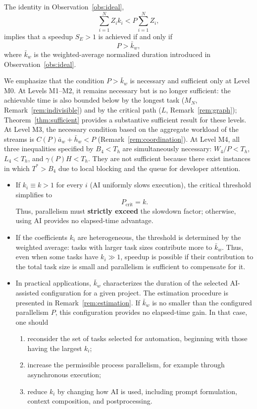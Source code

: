 \begin{remark}\label{rem:threshold}
The identity in Observation~\ref{obs:ideal},
\[
  \sum_{i=1}^{N} Z_i k_i < P \sum_{i=1}^{N} Z_i,
\]
implies that a speedup $S_E > 1$ is achieved if and only if
\[
  P > \bar{k}_w,
\]
where $\bar{k}_w$ is the weighted-average normalized duration introduced in Observation~\ref{obs:ideal}.

We emphasize that the condition $P > \bar{k}_w$ is necessary and sufficient only at Level M0. At Levels M1--M2, it remains necessary but is no longer sufficient: the achievable time is also bounded below by the longest task ($M_N$, Remark~\ref{rem:indivisible}) and by the critical path ($L$, Remark~\ref{rem:graph}); Theorem~\ref{thm:sufficient} provides a substantive sufficient result for these levels. At Level M3, the necessary condition based on the aggregate workload of the streams is $C(P)\bar a_w+\bar h_w<P$ (Remark~\ref{rem:coordination}). At Level M4, all three inequalities specified by $B_4<T_h$ are simultaneously necessary: $W_4/P<T_h$, $L_4<T_h$, and $\gamma(P)H<T_h$. They are not sufficient because there exist instances in which $T^{*}>B_4$ due to local blocking and the queue for developer attention.

\begin{itemize}
  \item If $k_i \equiv k > 1$ for every $i$ (AI uniformly slows execution), the critical threshold simplifies to
  \[
    P_{\text{crit}} = k.
  \]
  Thus, parallelism must \textbf{strictly exceed} the slowdown factor; otherwise, using AI provides no elapsed-time advantage.

  \item If the coefficients $k_i$ are heterogeneous, the threshold is determined by the weighted average: tasks with larger task sizes contribute more to $\bar{k}_w$. Thus, even when some tasks have $k_i \gg 1$, speedup is possible if their contribution to the total task size is small and parallelism is sufficient to compensate for it.

  \item In practical applications, $\bar{k}_w$ characterizes the duration of the selected AI-assisted configuration for a given project. The estimation procedure is presented in Remark~\ref{rem:estimation}. If $\bar{k}_w$ is no smaller than the configured parallelism $P$, this configuration provides no elapsed-time gain. In that case, one should
  \begin{enumerate}
    \item reconsider the set of tasks selected for automation, beginning with those having the largest $k_i$;
    \item increase the permissible process parallelism, for example through asynchronous execution;
    \item reduce $k_i$ by changing how AI is used, including prompt formulation, context composition, and postprocessing.
  \end{enumerate}
\end{itemize}


\end{remark}
